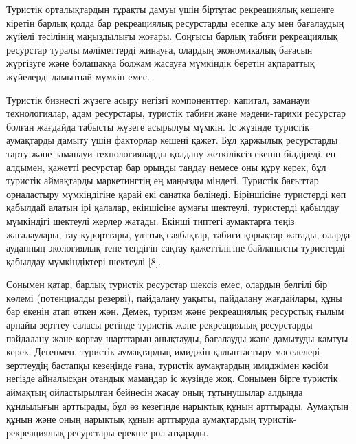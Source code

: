 \begin{multicols}{2}
Туристік орталықтардың тұрақты дамуы үшін біртұтас рекреациялық кешенге
кіретін барлық қолда бар рекреациялық ресурстарды есепке алу мен
бағалаудың жүйелі тәсілінің маңыздылығы жоғары. Соңғысы барлық табиғи
рекреациялық ресурстар туралы мәліметтерді жинауға, олардың экономикалық
бағасын жүргізуге және болашаққа болжам жасауға мүмкіндік беретін
ақпараттық жүйелерді дамытпай мүмкін емес.

Туристік бизнесті жүзеге асыру негізгі компоненттер: капитал, заманауи
технологиялар, адам ресурстары, туристік табиғи және мәдени-тарихи
ресурстар болған жағдайда табысты жүзеге асырылуы мүмкін. Іс жүзінде
туристік аумақтарды дамыту үшін факторлар кешені қажет. Бұл қаржылық
ресурстарды тарту және заманауи технологияларды қолдану жеткіліксіз
екенін білдіреді, ең алдымен, қажетті ресурстар бар орынды таңдау немесе
оны құру керек, бұл туристік аймақтарды маркетингтің ең маңызды міндеті.
Туристік бағыттар орналастыру мүмкіндігіне қарай екі санатқа бөлінеді.
Біріншісіне туристерді көп қабылдай алатын ірі қалалар, екіншісіне
аумағы шектеулі, туристерді қабылдау мүмкіндігі шектеулі жерлер жатады.
Екінші типтегі аумақтарға теңіз жағалаулары, тау курорттары, ұлттық
саябақтар, табиғи қорықтар жатады, оларда ауданның экологиялық
тепе-теңдігін сақтау қажеттілігіне байланысты туристерді қабылдау
мүмкіндіктері шектеулі {[}8{]}.

Сонымен қатар, барлық туристік ресурстар шексіз емес, олардың белгілі
бір көлемі (потенциалды резерві), пайдалану уақыты, пайдалану
жағдайлары, құны бар екенін атап өткен жөн. Демек, туризм және
рекреациялық ресурстық ғылым арнайы зерттеу саласы ретінде туристік және
рекреациялық ресурстарды пайдалану және қорғау шарттарын анықтауды,
бағалауды және дамытуды қамтуы керек. Дегенмен, туристік аумақтардың
имиджін қалыптастыру мәселелері зерттеудің бастапқы кезеңінде ғана,
туристік аумақтардың имиджімен кәсіби негізде айналысқан отандық
мамандар іс жүзінде жоқ. Сонымен бірге туристік аймақтың ойластырылған
бейнесін жасау оның тұтынушылар алдында құндылығын арттырады, бұл өз
кезегінде нарықтық құнын арттырады. Аумақтың құнын және оның нарықтық
құнын арттыруда аумақтардың туристік-рекреациялық ресурстары ерекше рөл
атқарады.


\end{multicols}
